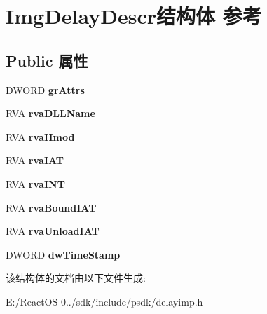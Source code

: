 \hypertarget{struct_img_delay_descr}{}\section{Img\+Delay\+Descr结构体 参考}
\label{struct_img_delay_descr}
\subsection*{Public 属性}
\begin{DoxyCompactItemize}
\item 
\mbox{\label{struct_img_delay_descr_a999b7ef76a362de0fcc5180fbecb98cf}} 
D\+W\+O\+RD {\bfseries gr\+Attrs}
\item 
\mbox{\label{struct_img_delay_descr_a56ada6e8058b64b3b5f743ca656e4205}} 
R\+VA {\bfseries rva\+D\+L\+L\+Name}
\item 
\mbox{\label{struct_img_delay_descr_a4deff5c04d5aaf781b1d741a98571d4b}} 
R\+VA {\bfseries rva\+Hmod}
\item 
\mbox{\label{struct_img_delay_descr_a4daa44f2bceb3597bd1689df312420c6}} 
R\+VA {\bfseries rva\+I\+AT}
\item 
\mbox{\label{struct_img_delay_descr_a962354c16502c6d899a8a070f64e25d5}} 
R\+VA {\bfseries rva\+I\+NT}
\item 
\mbox{\label{struct_img_delay_descr_a133283e0c928a955fc5d0c5caf3b7323}} 
R\+VA {\bfseries rva\+Bound\+I\+AT}
\item 
\mbox{\label{struct_img_delay_descr_a072304affbb377cbb9f3caa5a3650816}} 
R\+VA {\bfseries rva\+Unload\+I\+AT}
\item 
\mbox{\label{struct_img_delay_descr_a405c3861946c09760e54816c31aaa75a}} 
D\+W\+O\+RD {\bfseries dw\+Time\+Stamp}
\end{DoxyCompactItemize}


该结构体的文档由以下文件生成\+:\begin{DoxyCompactItemize}
\item 
E\+:/\+React\+O\+S-\/0../sdk/include/psdk/delayimp.\+h\end{DoxyCompactItemize}
